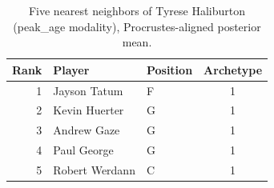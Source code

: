 \begin{table}[htbp]
  \centering\small
  \begin{tabular}{rllc}
    \toprule
    Rank & Player & Position & Archetype \\
    \midrule
    1 & Jayson Tatum & F & 1 \\
    2 & Kevin Huerter & G & 1 \\
    3 & Andrew Gaze & G & 1 \\
    4 & Paul George & G & 1 \\
    5 & Robert Werdann & C & 1 \\
    \bottomrule
  \end{tabular}
  \caption{Five nearest neighbors of Tyrese Haliburton (peak_age modality), Procrustes-aligned posterior mean.}
  \label{tab:Tyrese_Haliburton_neighbors_peak_age}
\end{table}

